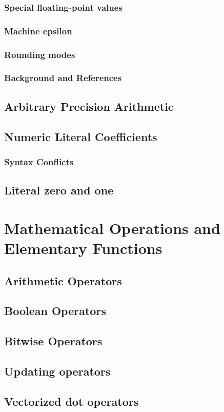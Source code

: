     \subsection{Special floating-point values}
    \subsection{Machine epsilon}
    \subsection{Rounding modes}
    \subsection{Background and References}
    \section{Arbitrary Precision Arithmetic}
    \section{Numeric Literal Coefficients}
    \subsection{Syntax Conflicts}
    \section{Literal zero and one}
\chapter{Mathematical Operations and Elementary Functions}
    \section{Arithmetic Operators}
    \section{Boolean Operators}
    \section{Bitwise Operators}
    \section{Updating operators}
    \section{Vectorized {\textquotedbl}dot{\textquotedbl} operators}
